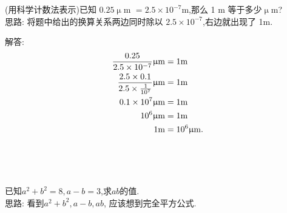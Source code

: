 \item {
    (用科学计数法表示)已知 $0.25 \upmu$m $ = 2.5\times 10^{-7}$m,那么 1 m 等于多少$\upmu$m?
    \ifshowSolution
        \fangsong{}
        \\
        思路: 将题中给出的换算关系两边同时除以 $2.5\times 10^{-7}$,右边就出现了 1m.

        解答: 
        \begin{align*}
            \frac{0.25}{2.5\times 10^{-7}} \rm{\upmu m} &= 1\rm{m}\\
            \frac{2.5\times 0.1}{2.5\times \frac{1}{10^7}} \rm{\upmu m} &= 1\rm{m}\\
            0.1\times 10^7 \rm{\upmu m} &= 1\rm{m}\\
            10^6 \rm{\upmu m} &= 1\rm{m}\\
            1\rm{m} &= 10^6 \rm{\upmu m}.
        \end{align*}
    \else
        \\ \\ \\
    \fi
}

\begin{comment}
    \item {
        若多项式$ 9x^2 - mx+16$是一个完全平方式,则 $m$的值是多少？
    }
    \\ \\ \\
\end{comment}

\item {
    已知$a^2+b^2=8, a-b=3$,求$ab$的值.
    \ifshowSolution
        \fangsong{}
        \\
        思路: 看到$a^2+b^2, a-b, ab$, 应该想到完全平方公式.
    \else
        \\ \\ \\
    \fi
}

\begin{comment}
    \item {
        若$x^2+mx+9$是完全平方式,求常数$m$的值.
    }
    \\ \\ \\

    \item {
        若$x+y=2$,求代数式$x^2-y^2+4y$的值.
    }
    \\ \\ \\
\end{comment}

